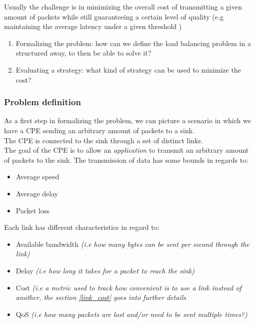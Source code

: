 \documentclass{article}
\begin{document}
 Usually the challenge is in minimizing the overall cost of transmitting a given amount of packets while still guaranteeing a certain level of quality (e.g maintaining the average latency under a given threshold )
 \begin{enumerate}
 	\item Formalizing the problem: how can we define the load balancing problem in a structured away, to then be able to solve it?
 	\item Evaluating a strategy: what kind of strategy can be used to minimize the cost?
 \end{enumerate}
\pagebreak

\subsubsection{Problem definition}

As a first step in formalizing the problem,  we can picture a scenario in which we have a CPE sending an arbitrary amount of packets to a sink. \\

The CPE is connected to the sink through a set of distinct links. \\

The goal of the CPE is to allow an \textit{application} to  transmit an arbitrary amount of packets to the sink. The transmission of data has some bounds in regards to:

\begin{itemize}
	\item Average speed
	\item Average delay
	\item Packet loss
\end{itemize}

Each link has different characteristics in regard to:
\begin{itemize}
	\item Available bandwidth \textit{(i.e how many bytes can be sent per second through the link)}
	\item Delay \textit{(i.e how long it takes for a packet to reach the sink)}
	\item Cost \textit{(i.e a metric used to track how convenient is to use a link instead of another, the section \ref{link_cost} goes into further details}
	\item QoS \textit{(i.e how many packets are lost and/or need to be sent multiple times?)}
\end{itemize} 
\end{document}
